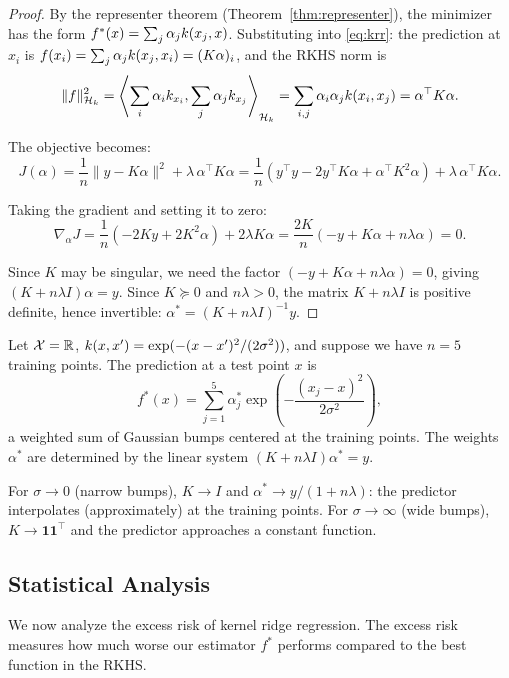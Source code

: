 \documentclass[11pt,a4paper]{article}
\begin{document}
\begin{proof}
By the representer theorem (Theorem~\ref{thm:representer}), the
minimizer has the form $f^*(x) = \sum_j \alpha_j k(x_j, x)$.
Substituting into \eqref{eq:krr}: the prediction at $x_i$ is
$f(x_i) = \sum_j \alpha_j k(x_j, x_i) = (K\alpha)_i$, and
the RKHS norm is
\[
\|f\|_{\mathcal{H}_k}^2 = \left\langle \sum_i \alpha_i k_{x_i},
\sum_j \alpha_j k_{x_j} \right\rangle_{\mathcal{H}_k}
= \sum_{i,j} \alpha_i \alpha_j k(x_i, x_j)
= \alpha^\top K \alpha.
\]

The objective becomes:
\[
J(\alpha) = \frac{1}{n} \|y - K\alpha\|^2 + \lambda \,
\alpha^\top K \alpha
= \frac{1}{n} (y^\top y - 2 y^\top K \alpha + \alpha^\top K^2
\alpha) + \lambda \, \alpha^\top K \alpha.
\]

Taking the gradient and setting it to zero:
\[
\nabla_\alpha J = \frac{1}{n} (-2Ky + 2K^2 \alpha) + 2\lambda K
\alpha = \frac{2K}{n}(-y + K\alpha + n\lambda \alpha) = 0.
\]

Since $K$ may be singular, we need the factor $(-y + K\alpha +
n\lambda \alpha) = 0$, giving $(K + n\lambda I)\alpha = y$.
Since $K \succeq 0$ and $n\lambda > 0$, the matrix $K + n\lambda I$
is positive definite, hence invertible:
$\alpha^* = (K + n\lambda I)^{-1} y$.
\end{proof}

\begin{example}
\label{ex:krr-gaussian}
Let $\mathcal{X} = \mathbb{R}$, $k(x, x') = \exp(-(x-x')^2 /
(2\sigma^2))$, and suppose we have $n = 5$ training points.
The prediction at a test point $x$ is
\[
f^*(x) = \sum_{j=1}^5 \alpha_j^* \exp\!\left(
-\frac{(x_j - x)^2}{2\sigma^2}\right),
\]
a weighted sum of Gaussian bumps centered at the training points.
The weights $\alpha^*$ are determined by the linear system
$(K + n\lambda I) \alpha^* = y$.

For $\sigma \to 0$ (narrow bumps), $K \to I$ and
$\alpha^* \to y / (1 + n\lambda)$: the predictor interpolates
(approximately) at the training points. For $\sigma \to \infty$
(wide bumps), $K \to \mathbf{1}\mathbf{1}^\top$ and the predictor
approaches a constant function.
\end{example}

\subsection{Statistical Analysis}

We now analyze the excess risk of kernel ridge regression.
The excess risk measures how much worse our estimator $f^*$
performs compared to the best function in the RKHS.
\end{document}
